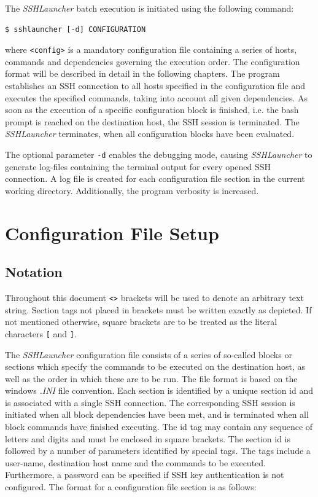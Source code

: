 The \emph{SSHLauncher} batch execution is initiated using the
following command:

\begin{verbatim}
$ sshlauncher [-d] CONFIGURATION
\end{verbatim}

where \Verb=<config>= is a mandatory configuration file containing a
series of hosts, commands and dependencies governing the execution
order. The configuration format will be described in detail in the
following chapters. The program establishes an SSH connection to all
hosts specified in the configuration file and executes the specified
commands, taking into account all given dependencies. As soon as the
execution of a specific configuration block is finished, i.e. the bash
prompt is reached on the destination host, the SSH session is
terminated. The \emph{SSHLauncher} terminates, when all configuration
blocks have been evaluated.

The optional parameter \Verb=-d= enables the debugging mode, causing \emph{SSHLauncher} to generate log-files containing the terminal output for every opened SSH connection. A log file is created for each configuration file section in the current working directory. Additionally, the program verbosity is increased.

\chapter{Configuration File Setup}

\section{Notation}
Throughout this document \Verb=<>= brackets will be used to denote an
arbitrary text string. Section tags not placed in brackets must be
written exactly as depicted. If not mentioned otherwise, square
brackets are to be treated as the literal characters \Verb=[= and
\Verb=]=.

The \emph{SSHLauncher} configuration file consists of a series of
so-called blocks or sections which specify the commands to be executed
on the destination host, as well as the order in which these are to be
run. The file format is based on the windows \emph{.INI} file
convention. Each section is identified by a unique section id and is
associated with a single SSH connection. The corresponding SSH session
is initiated when all block dependencies have been met, and is
terminated when all block commands have finished executing. The id tag
may contain any sequence of letters and digits and must be enclosed in
square brackets. The section id is followed by a number of parameters
identified by special tags. The tags include a user-name, destination
host name and the commands to be executed. Furthermore, a password can
be specified if SSH key authentication is not configured. The format
for a configuration file section is as follows:

